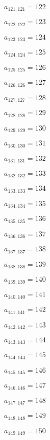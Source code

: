 \documentclass[a4paper,12pt]{article}
\begin{document}
$a _{ 121, 121 } = 122$

$a _{ 122, 122 } = 123$

$a _{ 123, 123 } = 124$

$a _{ 124, 124 } = 125$

$a _{ 125, 125 } = 126$

$a _{ 126, 126 } = 127$

$a _{ 127, 127 } = 128$

$a _{ 128, 128 } = 129$

$a _{ 129, 129 } = 130$

$a _{ 130, 130 } = 131$

$a _{ 131, 131 } = 132$

$a _{ 132, 132 } = 133$

$a _{ 133, 133 } = 134$

$a _{ 134, 134 } = 135$

$a _{ 135, 135 } = 136$

$a _{ 136, 136 } = 137$

$a _{ 137, 137 } = 138$

$a _{ 138, 138 } = 139$

$a _{ 139, 139 } = 140$

$a _{ 140, 140 } = 141$

$a _{ 141, 141 } = 142$

$a _{ 142, 142 } = 143$

$a _{ 143, 143 } = 144$

$a _{ 144, 144 } = 145$

$a _{ 145, 145 } = 146$

$a _{ 146, 146 } = 147$

$a _{ 147, 147 } = 148$

$a _{ 148, 148 } = 149$

$a _{ 149, 149 } = 150$
\end{document}
